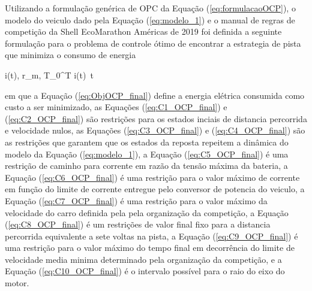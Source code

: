 Utilizando a formulação genérica de OPC da Equação (\ref{eq:formulacaoOCP}), o modelo do veiculo dado pela Equação (\ref{eq:modelo_1})
e o manual de regras de competição da Shell EcoMarathon Américas de 2019 
foi definida a seguinte formulação para o problema de controle ótimo de encontrar a estrategia de pista que minimiza o consumo de energia

\begin{mini!}
	{i(t), r_m, T}{\int_{0}^{T} i(t)  \,t \label{eq:ObjOCP_final}}
	{\label{eq:formulacaoOCP_final}}{}
\end{mini!}

em que a Equação (\ref{eq:ObjOCP_final}) define a energia elétrica consumida como custo a ser minimizado, 
as Equações (\ref{eq:C1_OCP_final}) e (\ref{eq:C2_OCP_final}) são restrições para os estados inciais de distancia percorrida e velocidade nulos, 
as Equações (\ref{eq:C3_OCP_final}) e (\ref{eq:C4_OCP_final}) são as restrições que garantem que os estados da reposta repeitem a dinâmica do modelo da Equação (\ref{eq:modelo_1}), 
a Equação (\ref{eq:C5_OCP_final}) é uma restrição de caminho para corrente em razão da tensão máxima da bateria, 
a Equação (\ref{eq:C6_OCP_final}) é uma restrição para o valor máximo de corrente em função do limite de corrente entregue pelo conversor de potencia do veiculo,
a Equação (\ref{eq:C7_OCP_final}) é uma restrição para o valor máximo da velocidade do carro definida pela pela organização da competição,
a Equação (\ref{eq:C8_OCP_final}) é um restrições de valor final fixo para a distancia percorrida equivalente a sete voltas na pista,
a Equação (\ref{eq:C9_OCP_final}) é uma restrição para o valor máximo do tempo final em decorrência do limite de velocidade media minima determinado pela organização da competição,
e a Equação (\ref{eq:C10_OCP_final}) é o intervalo possível para o raio do eixo do motor.


